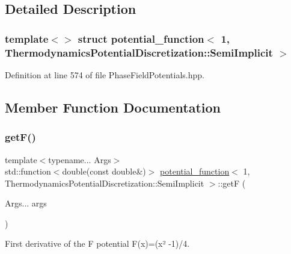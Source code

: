 \subsection{Detailed Description}
\subsubsection*{template$<$$>$\newline
struct potential\+\_\+function$<$ 1, Thermodynamics\+Potential\+Discretization\+::\+Semi\+Implicit $>$}



Definition at line 574 of file Phase\+Field\+Potentials.\+hpp.



\subsection{Member Function Documentation}
\mbox{\label{structpotential__function_3_011_00_01ThermodynamicsPotentialDiscretization_1_1SemiImplicit_01_4_a27140a669c8f1c66c03bb48bda4f33ff}} 
\subsubsection{\texorpdfstring{get\+F()}{getF()}}
{\footnotesize\ttfamily template$<$typename... Args$>$ \\
std\+::function$<$double(const double\&)$>$ \hyperlink{structpotential__function}{potential\+\_\+function}$<$ 1, Thermodynamics\+Potential\+Discretization\+::\+Semi\+Implicit $>$\+::getF (\begin{DoxyParamCaption}\item[{Args...}]{args }\end{DoxyParamCaption})\hspace{0.3cm}{\ttfamily [inline]}}



First derivative of the F potential F(x)=(x² -\/1)/4. 


